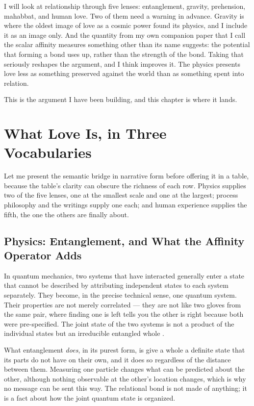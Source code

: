I will look at relationship through five lenses: entanglement, gravity, prehension, mahabbat, and human love. Two of them need a warning in advance. Gravity is where the oldest image of love as a cosmic power found its physics, and I include it as an image only. And the quantity from my own companion paper that I call the scalar affinity measures something other than its name suggests: the potential that forming a bond uses up, rather than the strength of the bond. Taking that seriously reshapes the argument, and I think improves it. The physics presents love less as something preserved against the world than as something spent into relation.

This is the argument I have been building, and this chapter is where it lands.

\section{What Love Is, in Three Vocabularies}
\label{sec:ch14-three-vocabularies}

Let me present the semantic bridge in narrative form before offering it in a table, because the table's clarity can obscure the richness of each row. Physics supplies two of the five lenses, one at the smallest scale and one at the largest; process philosophy and the \bahai writings supply one each; and human experience supplies the fifth, the one the others are finally about.

\subsection*{Physics: Entanglement, and What the Affinity Operator Adds}

In quantum mechanics, two systems that have interacted generally enter a state that cannot be described by attributing independent states to each system separately. They become, in the precise technical sense, one quantum system. Their properties are not merely correlated — they are not like two gloves from the same pair, where finding one is left tells you the other is right because both were pre-specified. The joint state of the two systems is not a product of the individual states but an irreducible entangled whole \citep{Bell1964, Aspect1982}.

What entanglement \emph{does}, in its purest form, is give a whole a definite state that its parts do not have on their own, and it does so regardless of the distance between them. Measuring one particle changes what can be predicted about the other, although nothing observable at the other's location changes, which is why no message can be sent this way. The relational bond is not made of anything; it is a fact about how the joint quantum state is organized.

